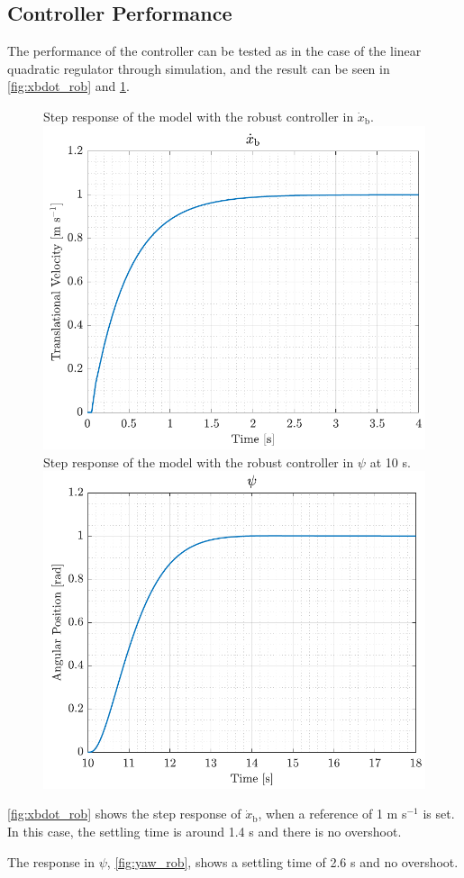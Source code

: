 \subsection{Controller Performance}
The performance of the controller can be tested as in the case of the linear quadratic regulator through simulation, and the result can be seen in \autoref{fig:xbdot_rob} and \ref{fig:yaw_rob}.
%
\begin{figure}[H]
    \captionbox 
    {   
        Step response of the model with the robust controller in $\dot{x}_\mathrm{b}$.
        \label{fig:xbdot_rob}
    }                                                                 
    {                                                                  
        \includegraphics[width=.45\textwidth]{figures/xbdot_rob}         
    }                                                                    
    \hspace{5pt}                                                          
    \captionbox  
    {      
        Step response of the model with the robust controller in $\psi$ at 10 s.
        \label{fig:yaw_rob}
    }                                                                          
    {
        \includegraphics[width=.45\textwidth]{figures/yaw_rob}
    }
\end{figure}
%
\autoref{fig:xbdot_rob} shows the step response of $\dot{x}_\mathrm{b}$, when a reference of 1 m s$^{-1}$ is set. In this case, the settling time is around \num{1.4} s and there is no overshoot.

The response in $\psi$, \autoref{fig:yaw_rob}, shows a settling time of \num{2.6} s and no overshoot.



